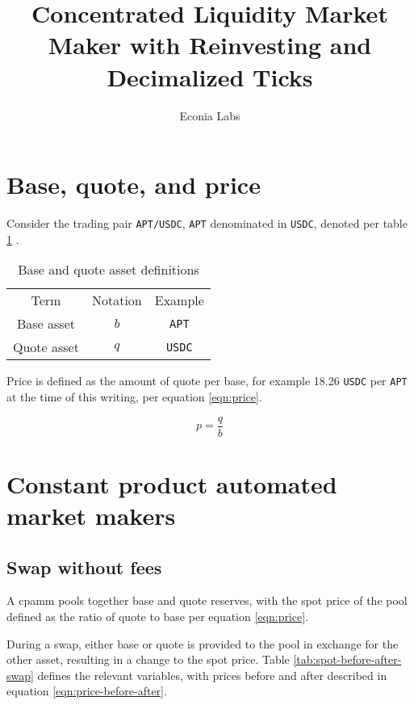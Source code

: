 \documentclass[table, twocolumn]{article}
\title{Concentrated Liquidity Market Maker with Reinvesting and Decimalized Ticks}
\author{Econia Labs}
\date{}
\begin{document}
\maketitle

\section{Base, quote, and price}

Consider the trading pair \texttt{APT/USDC}, \texttt{APT} denominated in \texttt{USDC}, denoted per
table \ref{tab:base-quote-definition} .

\begin{table}[ht]
  \centering
  \begin{tabular}{|c|c|c|}
    \hline
    \rowcolor{cyan}
    Term        & Notation & Example       \\
    Base asset  & $b$      & \texttt{APT}  \\
    Quote asset & $q$      & \texttt{USDC} \\
    \hline
  \end{tabular}
  \caption{Base and quote asset definitions}
  \label{tab:base-quote-definition}
\end{table}

Price is defined as the amount of quote per base, for example 18.26 \texttt{USDC} per \texttt{APT}
at the time of this writing, per equation \ref{eqn:price}.

\begin{equation} \label{eqn:price}
  p = \frac{q}{b}
\end{equation}

\section{Constant product automated market makers}

\subsection{Swap without fees}

A \gls{cpamm} pools together base and quote reserves, with the spot price of the pool defined as the
ratio of quote to base per equation \ref{eqn:price}.

During a swap, either base or quote is provided to the pool in exchange for the other asset,
resulting in a change to the spot price. Table \ref{tab:spot-before-after-swap} defines the relevant
variables, with prices before and after described in equation \ref{eqn:price-before-after}.
\end{document}
